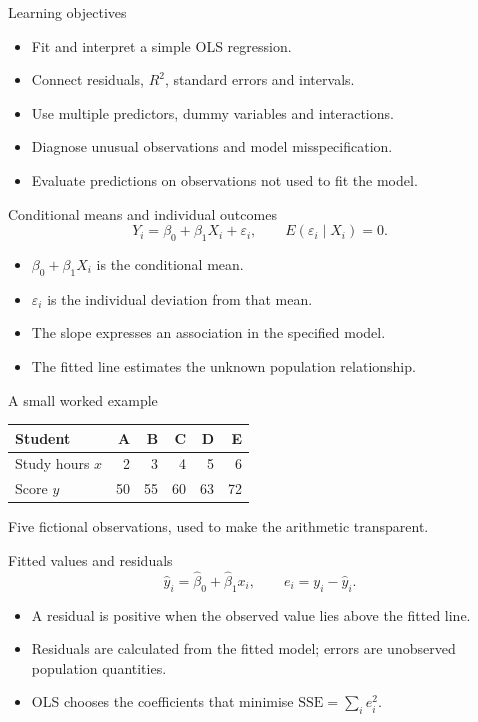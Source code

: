 \begin{frame}{Learning objectives}
\begin{itemize}
\item Fit and interpret a simple OLS regression.
\item Connect residuals, $R^2$, standard errors and intervals.
\item Use multiple predictors, dummy variables and interactions.
\item Diagnose unusual observations and model misspecification.
\item Evaluate predictions on observations not used to fit the model.
\end{itemize}
\end{frame}

\begin{frame}{Conditional means and individual outcomes}
\[Y_i=\beta_0+\beta_1X_i+\varepsilon_i,\qquad E(\varepsilon_i\mid X_i)=0.\]\begin{itemize}
\item $\beta_0+\beta_1X_i$ is the conditional mean.
\item $\varepsilon_i$ is the individual deviation from that mean.
\item The slope expresses an association in the specified model.
\item The fitted line estimates the unknown population relationship.
\end{itemize}
\end{frame}

\begin{frame}{A small worked example}
\begin{center}\begin{tabular}{lrrrrr}\toprule
Student & A & B & C & D & E\\\midrule Study hours $x$ & 2 & 3 & 4 & 5 & 6\\ Score $y$ & 50 & 55 & 60 & 63 & 72\\
\bottomrule\end{tabular}\end{center}Five fictional observations, used to make the arithmetic transparent.
\end{frame}

\begin{frame}{Fitted values and residuals}
\[\hat y_i=\hat\beta_0+\hat\beta_1x_i,\qquad e_i=y_i-\hat y_i.\]\begin{itemize}
\item A residual is positive when the observed value lies above the fitted line.
\item Residuals are calculated from the fitted model; errors are unobserved population quantities.
\item OLS chooses the coefficients that minimise $\mathrm{SSE}=\sum_i e_i^2$.
\end{itemize}
\end{frame}

